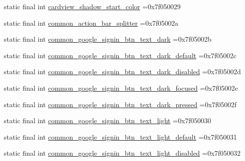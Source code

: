 \begin{DoxyCompactItemize}
\item 
static final int \mbox{\hyperlink{classbr_1_1unb_1_1cic_1_1mp_1_1marketmaster_1_1test_1_1R_1_1color_a1a9712e8f7298f264586971ee189b055}{cardview\+\_\+shadow\+\_\+start\+\_\+color}} =0x7f050029
\item 
static final int \mbox{\hyperlink{classbr_1_1unb_1_1cic_1_1mp_1_1marketmaster_1_1test_1_1R_1_1color_a86a0646ea6cf9dbfa6ddb29c71f76cc7}{common\+\_\+action\+\_\+bar\+\_\+splitter}} =0x7f05002a
\item 
static final int \mbox{\hyperlink{classbr_1_1unb_1_1cic_1_1mp_1_1marketmaster_1_1test_1_1R_1_1color_ab68bec755ba321f866ba32d7ba539c56}{common\+\_\+google\+\_\+signin\+\_\+btn\+\_\+text\+\_\+dark}} =0x7f05002b
\item 
static final int \mbox{\hyperlink{classbr_1_1unb_1_1cic_1_1mp_1_1marketmaster_1_1test_1_1R_1_1color_a738679c7c57139bf2bcc2a3bc0ce85da}{common\+\_\+google\+\_\+signin\+\_\+btn\+\_\+text\+\_\+dark\+\_\+default}} =0x7f05002c
\item 
static final int \mbox{\hyperlink{classbr_1_1unb_1_1cic_1_1mp_1_1marketmaster_1_1test_1_1R_1_1color_a597a51663cdadf0291fcc0029f323d34}{common\+\_\+google\+\_\+signin\+\_\+btn\+\_\+text\+\_\+dark\+\_\+disabled}} =0x7f05002d
\item 
static final int \mbox{\hyperlink{classbr_1_1unb_1_1cic_1_1mp_1_1marketmaster_1_1test_1_1R_1_1color_a29faa98c047a41e09a8fac357dfc83f7}{common\+\_\+google\+\_\+signin\+\_\+btn\+\_\+text\+\_\+dark\+\_\+focused}} =0x7f05002e
\item 
static final int \mbox{\hyperlink{classbr_1_1unb_1_1cic_1_1mp_1_1marketmaster_1_1test_1_1R_1_1color_a14e18a5350649b9c96df6570982ec597}{common\+\_\+google\+\_\+signin\+\_\+btn\+\_\+text\+\_\+dark\+\_\+pressed}} =0x7f05002f
\item 
static final int \mbox{\hyperlink{classbr_1_1unb_1_1cic_1_1mp_1_1marketmaster_1_1test_1_1R_1_1color_a5529af3f0a032c07bc77e625150bb409}{common\+\_\+google\+\_\+signin\+\_\+btn\+\_\+text\+\_\+light}} =0x7f050030
\item 
static final int \mbox{\hyperlink{classbr_1_1unb_1_1cic_1_1mp_1_1marketmaster_1_1test_1_1R_1_1color_a9b95f4d21f065a360ddbd8ea8b410c5c}{common\+\_\+google\+\_\+signin\+\_\+btn\+\_\+text\+\_\+light\+\_\+default}} =0x7f050031
\item 
static final int \mbox{\hyperlink{classbr_1_1unb_1_1cic_1_1mp_1_1marketmaster_1_1test_1_1R_1_1color_ad098549620b2378553ea96f80316f207}{common\+\_\+google\+\_\+signin\+\_\+btn\+\_\+text\+\_\+light\+\_\+disabled}} =0x7f050032

\end{DoxyCompactItemize}
